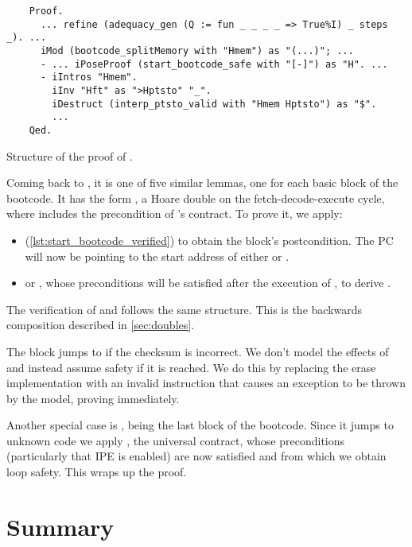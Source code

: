 \begin{listing}[H]
  \begin{verbatim}
    Proof.
      ... refine (adequacy_gen (Q := fun _ _ _ _ => True%I) _ steps _). ...
      iMod (bootcode_splitMemory with "Hmem") as "(...)"; ...
      - ... iPoseProof (start_bootcode_safe with "[-]") as "H". ...
      - iIntros "Hmem".
        iInv "Hft" as ">Hptsto" "_".
        iDestruct (interp_ptsto_valid with "Hmem Hptsto") as "$".
        ...
    Qed.
  \end{verbatim}
  \caption{Structure of the proof of .}
  \label{lst:e2e-proof}
\end{listing}

Coming back to , it is one of five similar lemmas, one for each basic block of the bootcode. It has the form , \ie a Hoare double on the fetch-decode-execute cycle, where  includes the precondition of 's contract. To prove it, we apply:
\begin{itemize}
\item {} (\cref{lst:start_bootcode_verified}) to obtain the block's postcondition. The PC will now be pointing to the start address of either  or .
\item {} or , whose preconditions will be satisfied after the execution of , to derive .
\end{itemize}
The verification of  and  follows the same structure. This is the backwards composition described in \cref{sec:doubles}.

The  block jumps to  if the checksum is incorrect. We don't model the effects of  and instead assume safety if it is reached. We do this by replacing the erase implementation with an invalid instruction that causes an exception to be thrown by the model, proving  immediately.

Another special case is , being the last block of the bootcode. Since it jumps to unknown code we apply , \ie the universal contract, whose preconditions (particularly that IPE is enabled) are now satisfied and from which we obtain loop safety. This wraps up the proof.

\section{Summary}

